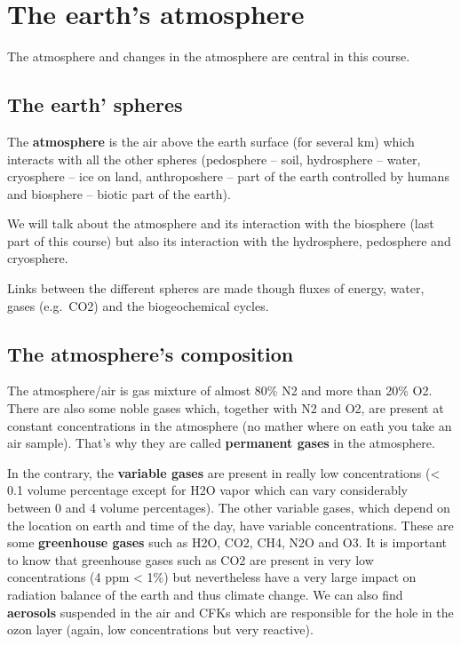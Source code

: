 \documentclass[oneside]{book}
\begin{document}

\section{The earth's atmosphere}\label{the-earths-atmosphere}

The atmosphere and changes in the atmosphere are central in this course.

\subsection{The earth' spheres}\label{the-earth-spheres}

The \textbf{atmosphere} is the air above the earth surface (for several
km) which interacts with all the other spheres (pedosphere -- soil,
hydrosphere -- water, cryosphere -- ice on land, anthroposhere -- part
of the earth controlled by humans and biosphere -- biotic part of the
earth).

We will talk about the atmosphere and its interaction with the biosphere
(last part of this course) but also its interaction with the
hydrosphere, pedosphere and cryosphere.

Links between the different spheres are made though fluxes of energy,
water, gases (e.g.~CO2) and the biogeochemical cycles.

\subsection{The atmosphere's
composition}\label{the-atmospheres-composition}

The atmosphere/air is gas mixture of almost 80\% N2 and more than 20\%
O2. There are also some noble gases which, together with N2 and O2, are
present at constant concentrations in the atmosphere (no mather where on
eath you take an air sample). That's why they are called
\textbf{permanent gases} in the atmosphere.

In the contrary, the \textbf{variable gases} are present in really low
concentrations (\textless{} 0.1 volume percentage except for H2O vapor
which can vary considerably between 0 and 4 volume percentages). The
other variable gases, which depend on the location on earth and time of
the day, have variable concentrations. These are some \textbf{greenhouse
gases} such as H2O, CO2, CH4, N2O and O3. It is important to know that
greenhouse gases such as CO2 are present in very low concentrations (4
ppm \textless{} 1\%) but nevertheless have a very large impact on
radiation balance of the earth and thus climate change. We can also find
\textbf{aerosols} suspended in the air and CFKs which are responsible
for the hole in the ozon layer (again, low concentrations but very
reactive).
\end{document}
